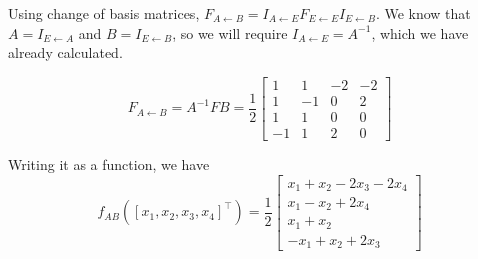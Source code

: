 \documentclass[a4paper,11pt]{exam}
\begin{document}
\begin{questions}
\begin{parts}
\begin{subparts}
\begin{solution}
                Using change of basis matrices, $F_{A \leftarrow B} = I_{A \leftarrow E} F_{E \leftarrow E} I_{E \leftarrow B}$.
                We know that $A = I_{E \leftarrow A}$ and $B = I_{E \leftarrow B}$,
                so we will require $I_{A \leftarrow E} = A^{-1}$, which we have already calculated.

                \[
                    F_{A \leftarrow B} = A^{-1} F B = \frac{1}{2} \left[
                        \begin{array}{cccc}
                            1 & 1 & -2 & -2 \\1 & -1 & 0 & 2\\1 & 1 & 0 & 0\\-1 & 1 & 2 & 0
                        \end{array}
                        \right]
                \]

                Writing it as a function, we have
                $$
                    f_{AB}\left(\left[x_1, x_2, x_3, x_4\right]^{\top}\right)
                    =\frac{1}{2}\left[
                        \begin{array}{c}
                            x_{1} + x_{2} - 2 x_{3} - 2 x_{4} \\x_{1} - x_{2} + 2 x_{4}\\x_{1} + x_{2}\\- x_{1} + x_{2} + 2 x_{3}
                        \end{array}
                        \right]
                $$
            \end{solution}
        \end{subparts}
    \end{parts}
\end{questions}
\end{document}
